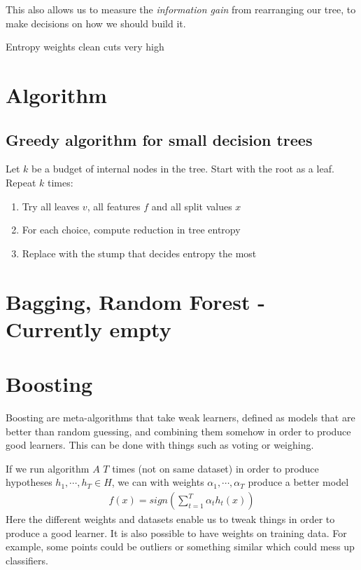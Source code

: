\documentclass{article}
\begin{document}
  This also allows us to measure the \emph{information gain} from rearranging our tree, to make decisions on how we should build it.

Entropy weights clean cuts very high

\section{Algorithm}

\subsection{Greedy algorithm for small decision trees}
  Let $k$ be a budget of internal nodes in the tree. Start with the root as a leaf. 
  Repeat $k$ times:
  \begin{enumerate}
    \item Try all leaves $v$, all features $f$ and all split values $x$
    \item For each choice, compute reduction in tree entropy
    \item Replace with the stump that decides entropy the most
  \end{enumerate}

\section{Bagging, Random Forest - Currently empty}


\section{Boosting}
  Boosting are meta-algorithms that take weak learners, defined as models that are better than random guessing, and combining them somehow in order to produce good learners. This can be done with things such as voting or weighing.
  
  If we run algorithm $A$ $T$ times (not on same dataset) in order to produce hypotheses $h_1, \cdots, h_T \in H$, we can with weights $\alpha_1, \cdots, \alpha_T$ produce a better model 
  \begin{align}
    f(x) = sign(
      \sum_{t=1}^{T}{\alpha_t h_t(x)}
    )
  \end{align}
  Here the different weights and datasets enable us to tweak things in order to produce a good learner. It is also possible to have weights on training data. For example, some points could be outliers or something similar which could mess up classifiers. 
\end{document}
